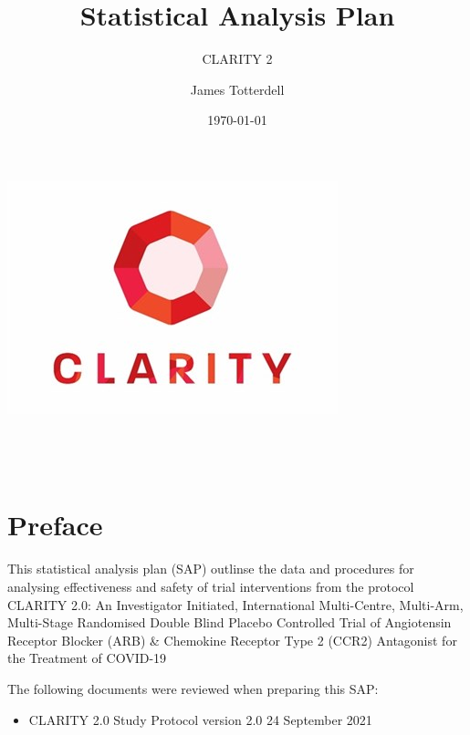 \documentclass[11pt,parskip=full-]{scrartcl}
\begin{document}
\title{Statistical Analysis Plan}
\subtitle{CLARITY 2}
\author{James Totterdell}
\date{\today}

\makeatletter
    \begin{titlepage}
        \begin{center}
            \includegraphics[width=0.7\linewidth]{clarity-logo.jpg}\\[4ex]
            {\huge \bfseries  \@title }\\[2ex] 
            {\LARGE \bfseries  \@subtitle }\\[2ex] 
            {\LARGE  \@author}\\[50ex] 
            {\large \@date}
        \end{center}
    \end{titlepage}
\makeatother
\thispagestyle{empty}
\newpage

\tableofcontents

\clearpage

\section*{Preface}

This statistical analysis plan (SAP) outlinse the data and procedures for analysing effectiveness and safety of trial interventions from the protocol CLARITY 2.0: An Investigator Initiated, International Multi-Centre, Multi-Arm, Multi-Stage Randomised Double Blind Placebo Controlled Trial of Angiotensin Receptor Blocker (ARB) \& Chemokine Receptor Type 2 (CCR2) Antagonist for the Treatment of COVID-19

The following documents were reviewed when preparing this SAP:
\begin{itemize}
    \item CLARITY 2.0 Study Protocol version 2.0 24 September 2021
\end{itemize}
\end{document}
